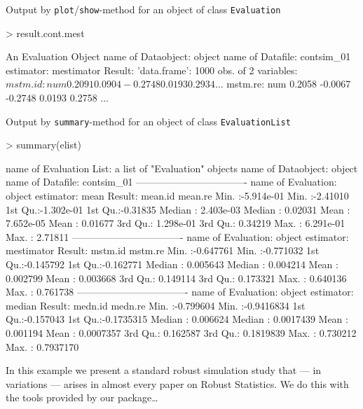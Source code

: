 \documentclass[11pt]{article}
\newcommand{\code}[1]{{\tt #1}}
\begin{document}
\par
\begin{footnotesize}
Output by \code{plot}/\code{show}-method for an object of class \code{Evaluation}
\begin{Schunk}
\begin{Sinput}
> result.cont.mest
\end{Sinput}
\begin{Soutput}
An Evaluation Object
name of Dataobject: object
name of Datafile: contsim_01
estimator: mestimator
Result: 'data.frame':   1000 obs. of  2 variables:
 $ mstm.id: num   0.2091  0.0904 -0.2748  0.0193  0.2934 ...
 $ mstm.re: num   0.2058 -0.0067 -0.2748  0.0193  0.2758 ...
\end{Soutput}
\end{Schunk}
\end{footnotesize}
\begin{footnotesize}
Output by \code{summary}-method for an object of class \code{EvaluationList}
\begin{Schunk}
\begin{Sinput}
> summary(elist)
\end{Sinput}
\begin{Soutput}
name of Evaluation List: a list of "Evaluation" objects
name of Dataobject: object
name of Datafile: contsim_01
----------------------------------
name of Evaluation: object
estimator: mean
Result:
    mean.id              mean.re
 Min.   :-5.914e-01   Min.   :-2.41010
 1st Qu.:-1.302e-01   1st Qu.:-0.31835
 Median : 2.403e-03   Median : 0.02031
 Mean   : 7.652e-05   Mean   : 0.01677
 3rd Qu.: 1.298e-01   3rd Qu.: 0.34219
 Max.   : 6.291e-01   Max.   : 2.71811
----------------------------------
name of Evaluation: object
estimator: mestimator
Result:
    mstm.id             mstm.re
 Min.   :-0.647761   Min.   :-0.771032
 1st Qu.:-0.145792   1st Qu.:-0.162771
 Median : 0.005643   Median : 0.004214
 Mean   : 0.002799   Mean   : 0.003668
 3rd Qu.: 0.149114   3rd Qu.: 0.173321
 Max.   : 0.640136   Max.   : 0.761738
----------------------------------
name of Evaluation: object
estimator: median
Result:
    medn.id             medn.re
 Min.   :-0.799604   Min.   :-0.9416834
 1st Qu.:-0.157043   1st Qu.:-0.1735315
 Median : 0.006624   Median : 0.0017439
 Mean   : 0.001194   Mean   : 0.0007357
 3rd Qu.: 0.162587   3rd Qu.: 0.1819839
 Max.   : 0.730212   Max.   : 0.7937170
\end{Soutput}
\end{Schunk}
\end{footnotesize}
\begin{small}
In this example we present a standard robust simulation study that --- in variations --- arises in almost
every paper on Robust Statistics. We do this with the tools provided by our package\ldots
\end{small}
\end{document}
